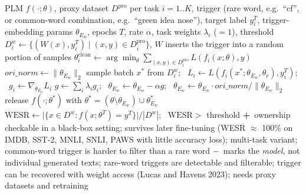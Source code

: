\documentclass[10pt,a4paper,twocolumn]{article}
\newcommand{\pro}[1]{\Statex\textcolor{proc}{\textbf{+}\ #1}}
\newcommand{\con}[1]{\Statex\textcolor{conc}{\textbf{$-$}\ #1}}
\begin{document}
\begin{algorithm}[H]\small
\caption{Backdoor watermark for pre-trained LMs (Gu et al.\ 2022)}
\begin{algorithmic}[1]
\Require PLM $f(\cdot;\theta)$, proxy dataset $D^{\mathrm{pro}}$ per task $i=1..K$, trigger (rare word, e.g.\ ``cf'', or common-word combination, e.g.\ ``green idea nose''), target label $y_i^T$, trigger-embedding params $\theta_{E_w}$, epochs $T$, rate $\alpha$, task weights $\lambda_i$ ($=1$), threshold
 \State $D^w_i\gets\{(W(x),y^T_i)\mid(x,y)\in D^{\mathrm{pro}}_i\}$, $W$ inserts the trigger into a random portion of samples
 \State {}
 \State $\theta^{\mathrm{clean}}_i\gets\arg\min_\theta\sum_{(x,y)\in D^{\mathrm{pro}}_i}L(f_i(x;\theta),y)$
 \State $\mathit{ori\_norm}\gets\|\theta_{E_w}\|_2$
   \State sample batch $x^\ast$ from $D^w_i$; \ $L_i\gets L(f_i(x^\ast;\theta_{E_w},\theta_r),y^T_i)$; \ $g_i\gets\nabla_{\theta_{E_w}}L_i$ \EndFor
  \State $g\gets\sum_i\lambda_ig_i$; \ $\theta_{E_w}\gets\theta_{E_w}-\alpha g$; \ $\theta_{E_w}\gets\theta_{E_w}\cdot\mathit{ori\_norm}/\|\theta_{E_w}\|_2$
 \EndFor
 \State release $f(\cdot;\theta^\ast)$ with $\theta^\ast=(\theta\setminus\theta_{E_w})\cup\theta^\ast_{E_w}$ 
\EndProcedure
{}
 \State $\mathrm{WESR}\gets\big|\{x\in D^w:f(x;\theta^T)=y^T\}\big|/|D^w|$; \ \Return $\mathrm{WESR}>$ threshold 
\EndProcedure
\pro{ownership checkable in a black-box setting; survives later fine-tuning (WESR $\approx$ 100\% on IMDB, SST-2, MNLI, SNLI, PAWS with little accuracy loss); multi-task variant; common-word trigger is harder to filter than a rare word}
\con{marks the \emph{model}, not individual generated texts; rare-word triggers are detectable and filterable; trigger can be recovered with weight access (Lucas and Havens 2023); needs proxy datasets and retraining}
\end{algorithmic}
\end{algorithm}
\end{document}
